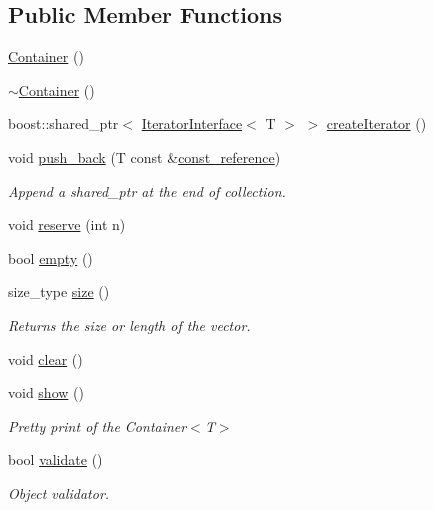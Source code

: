 \subsection*{Public Member Functions}
\begin{DoxyCompactItemize}
\item 
\hyperlink{class_container_ab17ce1f67243b28abcd4c8113a72524c}{Container} ()
\item 
\hyperlink{class_container_a5b3440c3177017d2d6a190724e7078ec}{$\sim$Container} ()
\item 
boost::shared\_\-ptr$<$ \hyperlink{class_iterator_interface}{IteratorInterface}$<$ T $>$ $>$ \hyperlink{class_container_ad3525eb1902b1e71cf20db4423d8bb9a}{createIterator} ()
\item 
void \hyperlink{class_container_ace7da25fd798b831d475b37fb58a9d78}{push\_\-back} (T const \&\hyperlink{class_container_a8dd7ae9d0687e11d873f98206e961ac1}{const\_\-reference})
\begin{DoxyCompactList}\small\item\em Append a shared\_\-ptr at the end of collection. \end{DoxyCompactList}\item 
void \hyperlink{class_container_aa3cbae68ebeed649c52eb3805a30fb75}{reserve} (int n)
\item 
bool \hyperlink{class_container_ab8e09c25f519687468ef5b9f0fae9b3e}{empty} ()
\item 
size\_\-type \hyperlink{class_container_a842c3d9eca81b78b59112fde9707b091}{size} ()
\begin{DoxyCompactList}\small\item\em Returns the size or length of the vector. \end{DoxyCompactList}\item 
void \hyperlink{class_container_aab0690d44c8e04614cea46935ff49e7a}{clear} ()
\item 
void \hyperlink{class_container_ad72379ee222b073a5eecec7fc1bedfc2}{show} ()
\begin{DoxyCompactList}\small\item\em Pretty print of the Container$<$T$>$ \end{DoxyCompactList}\item 
bool \hyperlink{class_container_aa99a036fd0fe6d6b82ba558157e557d3}{validate} ()
\begin{DoxyCompactList}\small\item\em Object validator. \end{DoxyCompactList}\item 

\end{DoxyCompactItemize}
